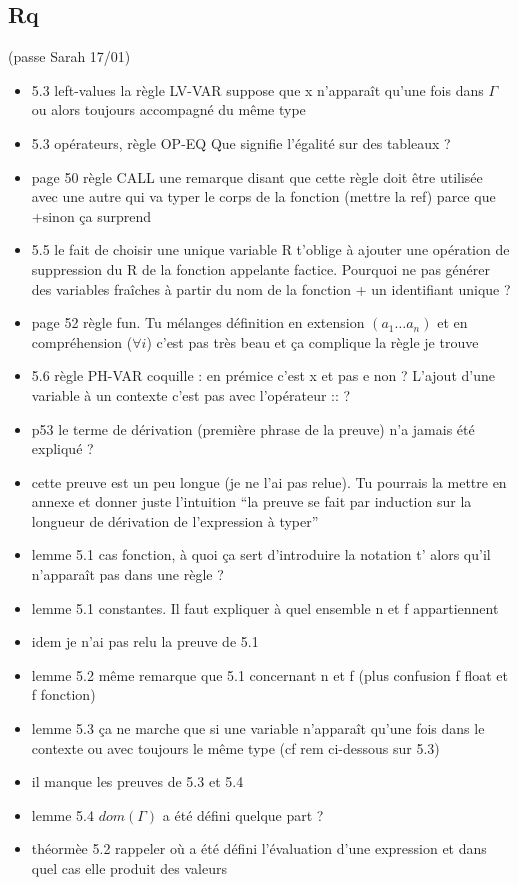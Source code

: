 \subsection*{Rq}
(passe Sarah 17/01)

\begin{itemize}
\item
  5.3 left-values la règle LV-VAR suppose que x n'apparaît qu'une fois
  dans $\Gamma$ ou alors toujours accompagné du même type
\item
  5.3 opérateurs, règle OP-EQ Que signifie l'égalité sur des tableaux ?
\item
  page 50 règle CALL une remarque disant que cette règle doit être
  utilisée avec une autre qui va typer le corps de la fonction (mettre
  la ref) parce que +sinon ça surprend
\item
  5.5 le fait de choisir une unique variable R t'oblige à ajouter une
  opération de suppression du R de la fonction appelante factice.
  Pourquoi ne pas générer des variables fraîches à partir du nom de la
  fonction + un identifiant unique ?
\item
  page 52 règle fun. Tu mélanges définition en extension $(a_1
  \ldots a_n)$ et en compréhension ($\forall i$) c'est pas très beau et ça
  complique la règle je trouve
\item
  5.6 règle PH-VAR coquille : en prémice c'est x et pas e non ? L'ajout
  d'une variable à un contexte c'est pas avec l'opérateur :: ?
\item
  p53 le terme de dérivation (première phrase de la preuve) n'a jamais
  été expliqué ?
\item
  cette preuve est un peu longue (je ne l'ai pas relue). Tu pourrais la
  mettre en annexe et donner juste l'intuition ``la preuve se fait par
  induction sur la longueur de dérivation de l'expression à typer''
\item
  lemme 5.1 cas fonction, à quoi ça sert d'introduire la notation t'
  alors qu'il n'apparaît pas dans une règle ?
\item
  lemme 5.1 constantes. Il faut expliquer à quel ensemble n et f
  appartiennent
\item
  idem je n'ai pas relu la preuve de 5.1
\item
  lemme 5.2 même remarque que 5.1 concernant n et f (plus confusion f
  float et f fonction)
\item
  lemme 5.3 ça ne marche que si une variable n'apparaît qu'une fois dans
  le contexte ou avec toujours le même type (cf rem ci-dessous sur 5.3)
\item
  il manque les preuves de 5.3 et 5.4
\item
  lemme 5.4 $dom(\Gamma)$ a été défini quelque part ?
\item
  théormèe 5.2 rappeler où a été défini l'évaluation d'une expression et
  dans quel cas elle produit des valeurs
\end{itemize}


